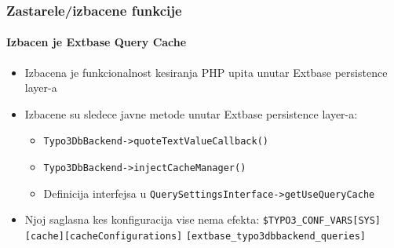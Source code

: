 \begin{frame}[fragile]
	\frametitle{Zastarele/izbacene funkcije}
	\framesubtitle{Izbacen je Extbase Query Cache}

	\begin{itemize}

		\item Izbacena je funkcionalnost kesiranja PHP upita unutar Extbase persistence layer-a

		\item Izbacene su sledece javne metode unutar Extbase persistence layer-a:

			\begin{itemize}
				\item \small\texttt{Typo3DbBackend->quoteTextValueCallback()}\normalsize
				\item \small\texttt{Typo3DbBackend->injectCacheManager()}\normalsize
				\item Definicija interfejsa u \small\texttt{QuerySettingsInterface->getUseQueryCache}\normalsize
			\end{itemize}

		\item Njoj saglasna kes konfiguracija vise nema efekta:\newline
			\smaller
				\texttt{\$TYPO3\_CONF\_VARS[SYS][cache][cacheConfigurations]}\newline
				\tabto{0.4cm}\texttt{[extbase\_typo3dbbackend\_queries]}
			\normalsize

	\end{itemize}

\end{frame}


